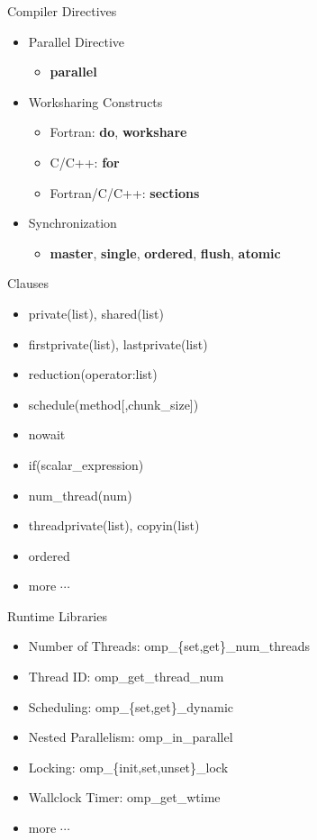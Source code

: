 \documentclass[c,mathserif,compress,xcolor=svgnames]{beamer}
\begin{document}
\begin{frame}{\small Compiler Directives}
  \begin{itemize}
    \item Parallel Directive
    \begin{itemize}
      \item {\bf\color{red!90!black}parallel}
    \end{itemize}
    \item Worksharing Constructs
    \begin{itemize}
      \item Fortran: {\bf\color{red!90!black}do}, {\bf\color{red!90!black}workshare}
      \item C/C++: {\bf\color{red!90!black}for}
      \item Fortran/C/C++: {\bf\color{red!90!black}sections}
    \end{itemize}
    \item Synchronization
    \begin{itemize}
      \item {\bf\color{red!90!black}master}, {\bf\color{red!90!black}single}, {\bf\color{red!90!black}ordered}, {\bf\color{red!90!black}flush}, {\bf\color{red!90!black}atomic}
    \end{itemize}
  \end{itemize}
\end{frame}

\begin{frame}{\small Clauses}
  \begin{itemize}
    \item private(list), shared(list)
    \item firstprivate(list), lastprivate(list)
    \item reduction(operator:list)
    \item schedule(method[,chunk\_size])
    \item nowait
    \item if(scalar\_expression)
    \item num\_thread(num)
    \item threadprivate(list), copyin(list)
    \item ordered
    \item more $\cdots$
  \end{itemize}
\end{frame}

\begin{frame}{\small Runtime Libraries}
  \begin{itemize}
    \item Number of Threads: omp\_\{set,get\}\_num\_threads
    \item Thread ID: omp\_get\_thread\_num
    \item Scheduling: omp\_\{set,get\}\_dynamic
    \item Nested Parallelism: omp\_in\_parallel
    \item Locking: omp\_\{init,set,unset\}\_lock
    \item Wallclock Timer: omp\_get\_wtime
    \item more $\cdots$
  \end{itemize}
\end{frame}
\end{document}
